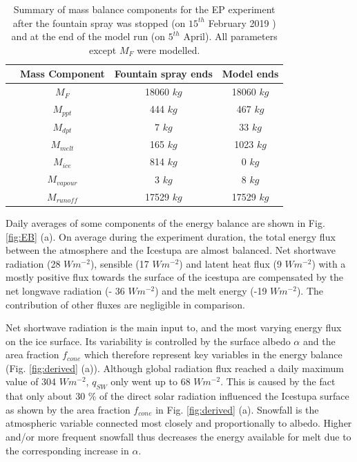 \documentclass[utf8]{frontiersSCNS} %
\begin{document}
\begin{table} \caption{Summary of mass balance components for the EP experiment after the fountain
  spray was stopped (on $15^{th}$ February 2019 ) and at the end of the model run (on $5^{th}$ April). All parameters
except $M_{F}$ were modelled.} \centering
    \begin{tabular}{|c|c|c|c|} \hline & \multicolumn{1}{c|}{Mass Component} & \multicolumn{1}{c|}{Fountain spray ends}
    & \multicolumn{1}{c|}{Model ends} \\
      \hline & $M_F$ & 18060 $kg$ & 18060 $kg$\\
    \parbox{2mm}{} & $M_{ppt}$ & 444 $kg$ & 467 $kg$\\
                                                    & $M_{dpt}$ & 7 $kg$ & 33
    $kg$ \\ \hline & $M_{melt}$ & 165 $kg$ & 1023 $kg$\\
    \parbox{2mm}{} & $M_{ice}$ &
    814 $kg$ & 0 $kg$\\ & $M_{vapour}$ & 3 $kg$ & 8 $kg$\\ & $M_{runoff}$ & 17529 $kg$ & 17529 $kg$\\
 
 \hline \end{tabular} \label{table:MB} \end{table}


Daily averages of some components of the energy balance are shown in Fig.  \ref{fig:EB} (a). On average during the
experiment duration, the total energy flux between the atmosphere and the Icestupa are almost balanced. Net shortwave
radiation (28 $Wm^{-2}$), sensible (17 $Wm^{-2}$) and latent heat flux (9 $Wm^{-2}$) with a mostly positive flux
towards the surface of the icestupa are compensated by the net longwave radiation (- 36 $Wm^{-2}$) and the melt energy
(-19 $Wm^{-2}$). The contribution of other fluxes are negligible in comparison.

Net shortwave radiation is the main input to, and the most varying energy flux on the ice surface. Its variability is
controlled by the surface albedo $\alpha$ and the area fraction $f_{cone}$ which therefore represent key variables in
the energy balance (Fig. \ref{fig:derived} (a)). Although global radiation flux reached a daily maximum value of 304
$Wm^{-2}$, $q_{SW}$ only went up to 68 $Wm^{-2}$. This is caused by the fact that only about 30 \% of the direct
solar radiation influenced the Icestupa surface as shown by the area fraction $f_{cone}$ in Fig. \ref{fig:derived}
(a).  Snowfall is the atmospheric variable connected most closely and proportionally to albedo.  Higher and/or more
frequent snowfall thus decreases the energy available for melt due to the corresponding increase in $\alpha$. 
\end{document}
